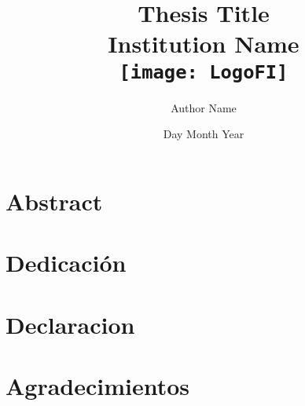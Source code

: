 \documentclass[a4paper,12pt]{book}
\title{
  {Thesis Title}\\
  {\Large Institution Name}\\
  {\texttt{[image: LogoFI]}}
}
\author{Author Name}
\date{Day Month Year}
\begin{document}
\maketitle



\tableofcontents
\chapter*{Abstract}
\blindtext
\chapter*{Dedicación}
\blindtext
\chapter*{Declaracion}
\blindtext
\chapter*{Agradecimientos}
\blindtext
\end{document}
